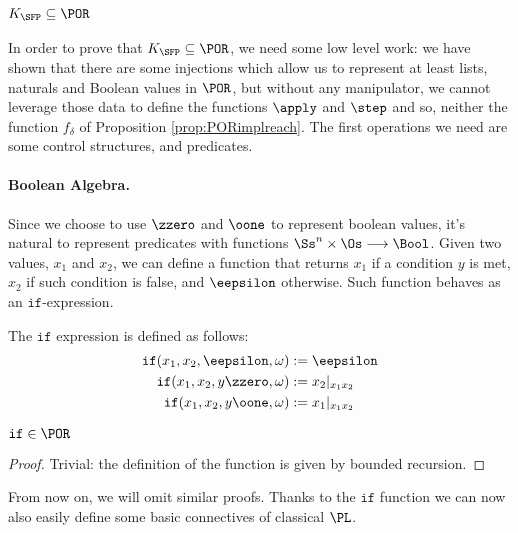 \begin{conditional}{\notappendix}
  \subsubsection{$K_\SFP\subseteq \POR$}


  In order to prove that $K_\SFP \subseteq \POR$,
  we need some low level work: we have shown that there are some injections
  which allow us to represent at least lists, naturals and
  Boolean values in $\POR$, but
  without any manipulator, we cannot leverage those data to define the
  functions $\apply$ and $\step$ and so, neither the function $f_\delta$
  of Proposition \ref{prop:PORimplreach}.
  The first operations we need are some control structures, and predicates.

  \paragraph{Boolean Algebra.}
  Since we choose to use $\zzero$ and
  $\oone$ to represent boolean values,
  it's natural to represent predicates
  with functions $\Ss^n \times \Os \longrightarrow \Bool$.
  Given two values, $x_1$ and $x_2$,
  we can define a function that
  returns $x_1$ if a condition $y$
  is met, $x_2$ if such condition is false,
  and $\eepsilon$ otherwise.
  Such function behaves as an $\mathtt{if}$-expression.


  \begin{defn}
  The $\mathtt{if}$ expression is defined as follows:
  \begin{align*}
  \mathtt{if}(x_1,x_2,\eepsilon, \omega) &:= \eepsilon \\
  \mathtt{if}(x_1,x_2,y\zzero, \omega) &:= x_2|_{x_1x_2} \\
  \mathtt{if}(x_1,x_2,y\oone, \omega) &:= x_1|_{x_1x_2} \\
  \end{align*}
  \end{defn}
  \begin{remark}
    $\mathtt{if} \in\POR$
  \end{remark}
  \begin{proof}
    Trivial: the definition of the function is given by bounded recursion.
  \end{proof}
  From now on, we will omit similar proofs.
  \noindent
  Thanks to the $\mathtt{if}$ function we can now
  also easily define some basic connectives
  of classical $\PL$.


\end{conditional}
